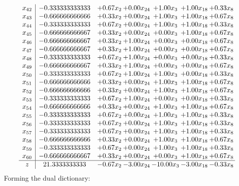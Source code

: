 \documentclass[8pt]{article}
\begin{document}
\[\begin{array}{c| c c@{\hskip 2pt} c@{\hskip 2pt} c@{\hskip 2pt} c@{\hskip 2pt} c@{\hskip 2pt} }
 x_{42}   &  -0.333333333333 & +  0.67 x_{2} & +  0.00 x_{24} & +  1.00 x_{3} & +  1.00 x_{18} & +  0.33 x_{8}\\
 x_{43}   &  -0.666666666666 & +  0.33 x_{2} & +  0.00 x_{24} & +  1.00 x_{3} & +  1.00 x_{18} & +  0.67 x_{8}\\
 x_{44}   &  -0.333333333333 & +  0.67 x_{2} & +  0.00 x_{24} & +  1.00 x_{3} & +  1.00 x_{18} & +  0.33 x_{8}\\
 x_{45}   &  -0.666666666667 & +  0.33 x_{2} & +  0.00 x_{24} & +  0.00 x_{3} & +  1.00 x_{18} & +  0.67 x_{8}\\
 x_{46}   &  -0.666666666667 & +  0.33 x_{2} & +  1.00 x_{24} & +  0.00 x_{3} & +  0.00 x_{18} & +  0.67 x_{8}\\
 x_{47}   &  -0.666666666667 & +  0.33 x_{2} & +  1.00 x_{24} & +  0.00 x_{3} & +  0.00 x_{18} & +  0.67 x_{8}\\
 x_{48}   &  -0.333333333333 & +  0.67 x_{2} & +  1.00 x_{24} & +  0.00 x_{3} & +  0.00 x_{18} & +  0.33 x_{8}\\
 x_{49}   &  -0.666666666667 & +  0.33 x_{2} & +  1.00 x_{24} & +  0.00 x_{3} & +  0.00 x_{18} & +  0.67 x_{8}\\
 x_{50}   &  -0.333333333333 & +  0.67 x_{2} & +  1.00 x_{24} & +  1.00 x_{3} & +  0.00 x_{18} & +  0.33 x_{8}\\
 x_{51}   &  -0.666666666666 & +  0.33 x_{2} & +  0.00 x_{24} & +  1.00 x_{3} & +  1.00 x_{18} & +  0.67 x_{8}\\
 x_{52}   &  -0.666666666666 & +  0.33 x_{2} & +  0.00 x_{24} & +  1.00 x_{3} & +  1.00 x_{18} & +  0.67 x_{8}\\
 x_{53}   &  -0.333333333333 & +  0.67 x_{2} & +  1.00 x_{24} & +  0.00 x_{3} & +  0.00 x_{18} & +  0.33 x_{8}\\
 x_{54}   &  -0.666666666666 & +  0.33 x_{2} & +  0.00 x_{24} & +  1.00 x_{3} & +  1.00 x_{18} & +  0.67 x_{8}\\
 x_{55}   &  -0.333333333333 & +  0.67 x_{2} & +  0.00 x_{24} & +  1.00 x_{3} & +  1.00 x_{18} & +  0.33 x_{8}\\
 x_{56}   &  -0.333333333333 & +  0.67 x_{2} & +  0.00 x_{24} & +  1.00 x_{3} & +  1.00 x_{18} & +  0.33 x_{8}\\
 x_{57}   &  -0.333333333333 & +  0.67 x_{2} & +  0.00 x_{24} & +  1.00 x_{3} & +  1.00 x_{18} & +  0.33 x_{8}\\
 x_{58}   &  -0.666666666666 & +  0.33 x_{2} & +  0.00 x_{24} & +  1.00 x_{3} & +  1.00 x_{18} & +  0.67 x_{8}\\
 x_{59}   &  -0.333333333333 & +  0.67 x_{2} & +  0.00 x_{24} & +  1.00 x_{3} & +  1.00 x_{18} & +  0.33 x_{8}\\
 x_{60}   &  -0.666666666667 & +  0.33 x_{2} & +  0.00 x_{24} & +  0.00 x_{3} & +  1.00 x_{18} & +  0.67 x_{8}\\
\hline
z    &  21.3333333333 & -0.67 x_{2} & -3.00 x_{24} & -10.00 x_{3} & -3.00 x_{18} & -0.33 x_{8}\\
\end{array}\]
Forming the dual dictionary:
\end{document}
